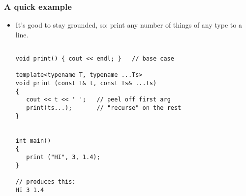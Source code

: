 \begin{frame}[fragile,t]
\frametitle{A quick example}
\begin{itemize}[<+->]
\item It's good to stay grounded, so: print any number of things of
  any type to a line.
{\scriptsize\begin{verbatim}

void print() { cout << endl; }   // base case

template<typename T, typename ...Ts>
void print (const T& t, const Ts& ...ts)
{
   cout << t << ' ';   // peel off first arg
   print(ts...);       // "recurse" on the rest
}


int main()
{
   print ("HI", 3, 1.4);
}

// produces this:
HI 3 1.4
\end{verbatim}
}
\end{itemize}
\end{frame}



